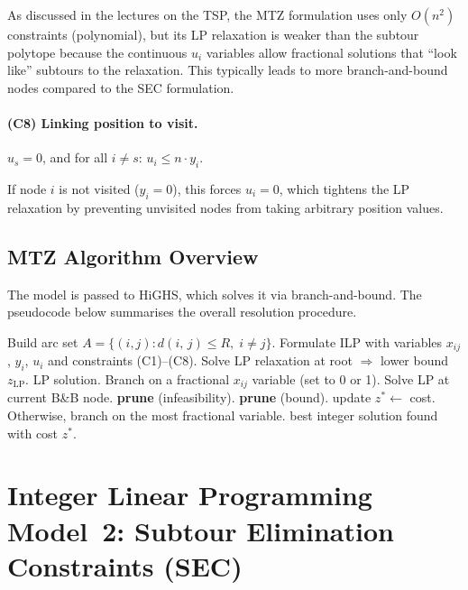 \documentclass[12pt, a4paper]{article}
\newcommand{\dist}[2]{d(#1,\,#2)}
\begin{document}
As discussed in the lectures on the TSP, the MTZ formulation uses only
$O(n^2)$ constraints (polynomial), but its LP relaxation is weaker than the subtour
polytope because the continuous $u_i$ variables allow fractional solutions that
``look like'' subtours to the relaxation. This typically leads to more
branch-and-bound nodes compared to the SEC formulation.

\paragraph{(C8) Linking position to visit.}
$u_s = 0$, and for all $i \neq s$: $u_i \leq n \cdot y_i$.

If node $i$ is not visited ($y_i = 0$), this forces $u_i = 0$, which tightens the
LP relaxation by preventing unvisited nodes from taking arbitrary position values.

\subsection{MTZ Algorithm Overview}

The model is passed to HiGHS, which solves it via branch-and-bound. The pseudocode
below summarises the overall resolution procedure.

\begin{algorithm}[H]
\caption{MTZ-based solve}
\begin{algorithmic}[1]
\State Build arc set $A = \{(i,j) : \dist{i}{j} \leq R,\; i \neq j\}$.
\State Formulate ILP with variables $x_{ij}$, $y_i$, $u_i$ and constraints (C1)--(C8).
\State Solve LP relaxation at root $\Rightarrow$ lower bound $z_{\mathrm{LP}}$.
  \State \Return LP solution.
\EndIf
\State Branch on a fractional $x_{ij}$ variable (set to 0 or 1).
\Repeat
  \State Solve LP at current B\&B node.
   \textbf{prune} (infeasibility). \EndIf
   \textbf{prune} (bound). \EndIf
   update $z^* \leftarrow$ cost. \EndIf
  \State Otherwise, branch on the most fractional variable.
\State \Return best integer solution found with cost $z^*$.
\end{algorithmic}
\end{algorithm}


\section{Integer Linear Programming Model~2: Subtour Elimination Constraints (SEC)}
\end{document}
